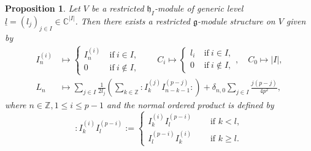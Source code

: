 \documentclass[12pt, reqno]{amsart}
\numberwithin{equation}{section}
\newtheorem{proposition}[theorem]{Proposition}%
\numberwithin{equation}{section}
\def\dt{\delta}
\def\h{\mathfrak{h}}
\def\g{\mathfrak{g}}
\def\hi{\h_I}
\newcommand{\C}{\mathbb C}
\newcommand{\Z}{\mathbb{Z}}
\newcommand{\un}[1]{\underline{#1}}
\newcommand{\elei}[2]{I_{#1}^{(#2)}}
\begin{document}
\begin{proposition}\label{proprealize}
 Let $V$ be a restricted $\hi$-module of generic level $\un l=(l_j)_{j\in I}\in \C^{|I|}$.
 Then there exists a restricted $\g$-module structure on $V$ given by
 \begin{align}
  \elei ni &\mapsto \begin{cases} \elei ni\ &\text{if}\ i\in I,\\
                                        0\ &\text{if}\ i\notin I,\end{cases}\ \ \ \ \quad
  C_i\mapsto \begin{cases} l_i\ &\text{if}\ i\in I,\\
                            0 \ &\text{if}\ i\notin I,\end{cases},\quad C_0\mapsto |I|,\label{eq:Iaction}\\
    L_n   &\mapsto \sum_{j\in I}\frac{1}{2l_j}\left(\sum_{k\in \Z} :
                    \elei kj\elei{n-k-1}{p-j}:\right)
                   +\dt_{n,0}\sum_{j\in I}\frac{j(p-j)}{4p^2},       \label{eq:Lnaction}
 \end{align}
 where $n\in\Z, 1\leq i\leq p-1$ and the normal ordered product is defined by
\begin{equation*}
   :\elei ki\elei l{p-i}:=\begin{cases}
      \elei ki\elei l{p-i}\quad&\text{ if }k<l,\\
      \elei l{p-i}\elei ki \quad&\text{ if }k\ge l.
   \end{cases}
\end{equation*}
\end{proposition}
\end{document}
